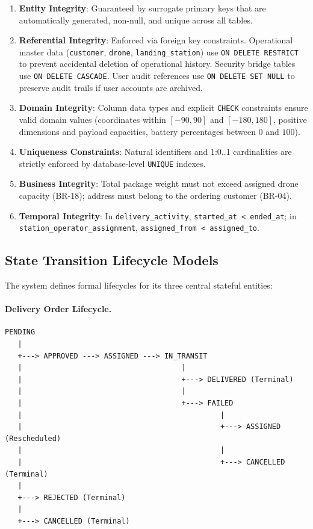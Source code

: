 \begin{enumerate}
    \item \textbf{Entity Integrity}: Guaranteed by surrogate primary keys that are automatically generated, non-null, and unique across all tables.
    \item \textbf{Referential Integrity}: Enforced via foreign key constraints. Operational master data (\texttt{customer}, \texttt{drone}, \texttt{landing\_station}) use \texttt{ON DELETE RESTRICT} to prevent accidental deletion of operational history. Security bridge tables use \texttt{ON DELETE CASCADE}. User audit references use \texttt{ON DELETE SET NULL} to preserve audit trails if user accounts are archived.
    \item \textbf{Domain Integrity}: Column data types and explicit \texttt{CHECK} constraints ensure valid domain values (coordinates within $[-90, 90]$ and $[-180, 180]$, positive dimensions and payload capacities, battery percentages between $0$ and $100$).
    \item \textbf{Uniqueness Constraints}: Natural identifiers and 1:0..1 cardinalities are strictly enforced by database-level \texttt{UNIQUE} indexes.
    \item \textbf{Business Integrity}: Total package weight must not exceed assigned drone capacity (BR-18); address must belong to the ordering customer (BR-04).
    \item \textbf{Temporal Integrity}: In \texttt{delivery\_activity}, \texttt{started\_at < ended\_at}; in \texttt{station\_operator\_assignment}, \texttt{assigned\_from < assigned\_to}.
\end{enumerate}

\subsection{State Transition Lifecycle Models}\label{s:lifecycle}

The system defines formal lifecycles for its three central stateful entities:

\paragraph{Delivery Order Lifecycle.}
\begin{verbatim}
PENDING
   |
   +---> APPROVED ---> ASSIGNED ---> IN_TRANSIT
   |                                     |
   |                                     +---> DELIVERED (Terminal)
   |                                     |
   |                                     +---> FAILED
   |                                              |
   |                                              +---> ASSIGNED (Rescheduled)
   |                                              |
   |                                              +---> CANCELLED (Terminal)
   |
   +---> REJECTED (Terminal)
   |
   +---> CANCELLED (Terminal)
\end{verbatim}

